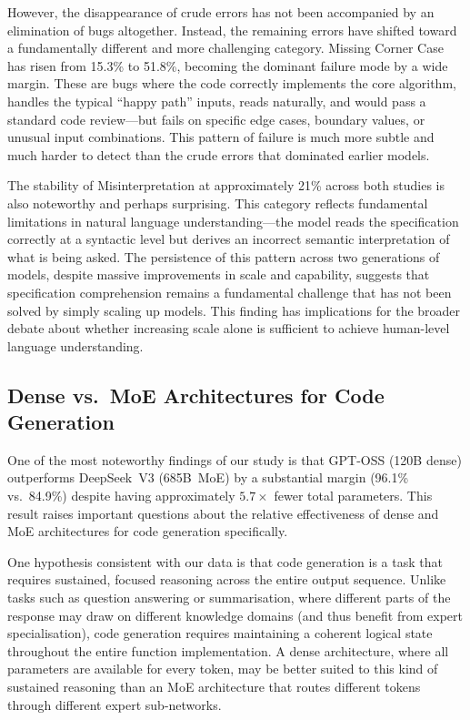 \documentclass[smallextended]{svjour3}
\begin{document}
However, the disappearance of crude errors has not been accompanied by an elimination of bugs altogether. Instead, the remaining errors have shifted toward a fundamentally different and more challenging category. Missing Corner Case has risen from 15.3\% to 51.8\%, becoming the dominant failure mode by a wide margin. These are bugs where the code correctly implements the core algorithm, handles the typical ``happy path'' inputs, reads naturally, and would pass a standard code review---but fails on specific edge cases, boundary values, or unusual input combinations. This pattern of failure is much more subtle and much harder to detect than the crude errors that dominated earlier models.

The stability of Misinterpretation at approximately 21\% across both studies is also noteworthy and perhaps surprising. This category reflects fundamental limitations in natural language understanding---the model reads the specification correctly at a syntactic level but derives an incorrect semantic interpretation of what is being asked. The persistence of this pattern across two generations of models, despite massive improvements in scale and capability, suggests that specification comprehension remains a fundamental challenge that has not been solved by simply scaling up models. This finding has implications for the broader debate about whether increasing scale alone is sufficient to achieve human-level language understanding.

\subsection{Dense vs.\ MoE Architectures for Code Generation}

One of the most noteworthy findings of our study is that GPT-OSS (120B dense) outperforms DeepSeek~V3 (685B~MoE) by a substantial margin (96.1\% vs.\ 84.9\%) despite having approximately $5.7\times$ fewer total parameters. This result raises important questions about the relative effectiveness of dense and MoE architectures for code generation specifically.

One hypothesis consistent with our data is that code generation is a task that requires sustained, focused reasoning across the entire output sequence. Unlike tasks such as question answering or summarisation, where different parts of the response may draw on different knowledge domains (and thus benefit from expert specialisation), code generation requires maintaining a coherent logical state throughout the entire function implementation. A dense architecture, where all parameters are available for every token, may be better suited to this kind of sustained reasoning than an MoE architecture that routes different tokens through different expert sub-networks.
\end{document}
